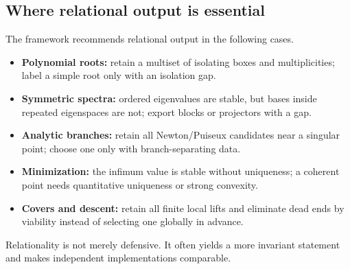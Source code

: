 \subsection{Where relational output is essential}

The framework recommends relational output in the following cases.

\begin{itemize}
\item \textbf{Polynomial roots:} retain a multiset of isolating boxes and
multiplicities; label a simple root only with an isolation gap.
\item \textbf{Symmetric spectra:} ordered eigenvalues are stable, but bases
inside repeated eigenspaces are not; export blocks or projectors with a gap.
\item \textbf{Analytic branches:} retain all Newton/Puiseux candidates near a
singular point; choose one only with branch-separating data.
\item \textbf{Minimization:} the infimum value is stable without uniqueness;
a coherent point needs quantitative uniqueness or strong convexity.
\item \textbf{Covers and descent:} retain all finite local lifts and eliminate
dead ends by viability instead of selecting one globally in advance.
\end{itemize}

Relationality is not merely defensive.  It often yields a more invariant
statement and makes independent implementations comparable.
